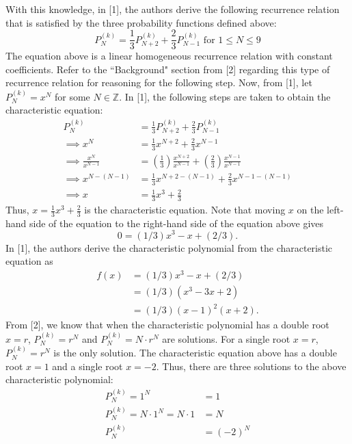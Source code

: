 \documentclass[12pt]{article}
\begin{document}
With this knowledge, in [1], the authors derive the following recurrence relation that is satisfied by the three probability functions defined above:
$$P^{(k)}_N = \frac{1}{3}P^{(k)}_{N+2} + \frac{2}{3}P^{(k)}_{N-1} \text{ for } 1 \leq N \leq 9$$
The equation above is a linear homogeneous recurrence relation with constant coefficients.
Refer to the ``Background" section from [2] regarding this type of recurrence relation for reasoning for the following step.
Now, from [1], let $P^{(k)}_N = x^N$ for some $N \in \mathbb{Z}$.
\newline
In [1], the following steps are taken to obtain the characteristic equation:
\begin{align}
    P^{(k)}_N &= \frac{1}{3}P^{(k)}_{N+2} + \frac{2}{3}P^{(k)}_{N-1} \\
    \implies x^N &= \frac{1}{3} x^{N+2} + \frac{2}{3} x^{N-1} \\
    \implies \frac{x^N}{x^{N-1}} &= \left( \frac{1}{3} \right) \frac{x^{N+2}}{x^{N-1}} + \left( \frac{2}{3} \right) \frac{x^{N-1}}{x^{N-1}} \\
    \implies x^{N-(N-1)} &= \frac{1}{3} x^{N+2-(N-1)} + \frac{2}{3}x^{N-1-(N-1)} \\
    \implies x &= \frac{1}{3} x^3 + \frac{2}{3}
\end{align}
Thus, $x = \frac{1}{3}x^3+\frac{2}{3}$ is the characteristic equation.  
\newline
Note that moving $x$ on the left-hand side of the equation to the right-hand side of the equation above gives
$$0 = (1/3)x^3 -x + (2/3).$$
In [1], the authors derive the characteristic polynomial from the characteristic equation as
\begin{align}
    f(x) &= (1/3)x^3 -x + (2/3) \\
    &= (1/3)(x^3 - 3x + 2) \\
    &= (1/3)(x - 1)^2(x + 2).
\end{align}
From [2], we know that when the characteristic polynomial has a double root $x = r$, $P^{(k)}_N = r^N$ and $P^{(k)}_N = N \cdot r^N$ are solutions. 
For a single root $x = r$, $P^{(k)}_N = r^N$ is the only solution. %
The characteristic equation above has a double root $x = 1$ and a single root $x = -2$.  
Thus, there are three solutions to the above characteristic polynomial:
\begin{align}
    P^{(k)}_N = 1^N &= 1 \\
    P^{(k)}_N = N \cdot 1^N = N \cdot 1 &= N \\
    P^{(k)}_N &= (-2)^N
\end{align}
\end{document}
